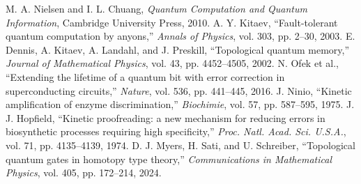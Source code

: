 \documentclass[11pt]{article}
\begin{document}
\begin{thebibliography}{99}
\itemsep 0pt
 M. A. Nielsen and I. L. Chuang, \emph{Quantum Computation and Quantum Information}, Cambridge University Press, 2010.
 A. Y. Kitaev, ``Fault-tolerant quantum computation by anyons,'' \emph{Annals of Physics}, vol. 303, pp. 2–30, 2003.
 E. Dennis, A. Kitaev, A. Landahl, and J. Preskill, ``Topological quantum memory,'' \emph{Journal of Mathematical Physics}, vol. 43, pp. 4452–4505, 2002.
 N. Ofek et al., ``Extending the lifetime of a quantum bit with error correction in superconducting circuits,'' \emph{Nature}, vol. 536, pp. 441–445, 2016.
 J. Ninio, ``Kinetic amplification of enzyme discrimination,'' \emph{Biochimie}, vol. 57, pp. 587–595, 1975.
 J. J. Hopfield, ``Kinetic proofreading: a new mechanism for reducing errors in biosynthetic processes requiring high specificity,'' \emph{Proc. Natl. Acad. Sci. U.S.A.}, vol. 71, pp. 4135–4139, 1974.
 D. J. Myers, H. Sati, and U. Schreiber, ``Topological quantum gates in homotopy type theory,'' \emph{Communications in Mathematical Physics}, vol. 405, pp. 172–214, 2024.
\end{thebibliography}
\end{document}
